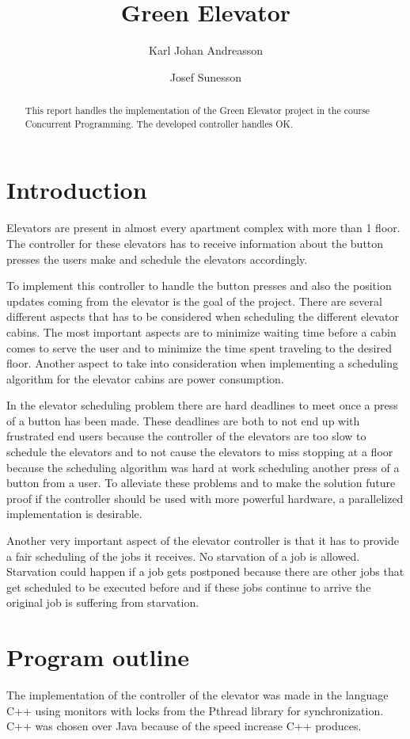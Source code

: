 \documentclass[10pt,a4paper]{article}
\author{Karl Johan Andreasson \and Josef Sunesson}
\title{Green Elevator}
\begin{document}
\maketitle

\begin{abstract} 
This report handles the implementation of the Green Elevator project in the course Concurrent Programming. The developed controller handles OK.
\end{abstract}

\section{Introduction}
Elevators are present in almost every apartment complex with more than 1 floor. The controller for these elevators has to receive information about the button presses the users make and schedule the elevators accordingly.

To implement this controller to handle the button presses and also the position updates coming from the elevator is the goal of the project. There are several different aspects that has to be considered when scheduling the different elevator cabins. The most important aspects are to minimize waiting time before a cabin comes to serve the user and to minimize the time spent traveling to the desired floor. Another aspect to take into consideration when implementing a scheduling algorithm for the elevator cabins are power consumption.

In the elevator scheduling problem there are hard deadlines to meet once a press of a button has been made. These deadlines are both to not end up with frustrated end users because the controller of the elevators are too slow to schedule the elevators and to not cause the elevators to miss stopping at a floor because the scheduling algorithm was hard at work scheduling another press of a button from a user. To alleviate these problems and to make the solution future proof if the controller should be used with more powerful hardware, a parallelized implementation is desirable.

Another very important aspect of the elevator controller is that it has to provide a fair scheduling of the jobs it receives. No starvation of a job is allowed. Starvation could happen if a job gets postponed because there are other jobs that get scheduled to be executed before and if these jobs continue to arrive the original job is suffering from starvation.

\section{Program outline}
The implementation of the controller of the elevator was made in the language C++ using monitors with locks from the Pthread library for synchronization. C++ was chosen over Java because of the speed increase C++ produces.
\end{document}
